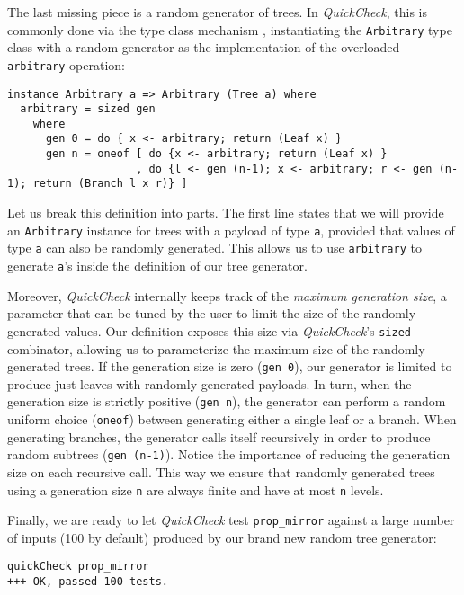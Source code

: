 \documentclass[acmsmall, anonymous]{acmart}
\newcommand{\quickcheck}{\textit{QuickCheck}\xspace}
\begin{document}
The last missing piece is a random generator of trees.
%
In \quickcheck, this is commonly done via the type class mechanism
\cite{jones1997type}, instantiating the \texttt{Arbitrary} type class with a
random generator as the implementation of the overloaded \texttt{arbitrary}
operation:

\begin{verbatim}
instance Arbitrary a => Arbitrary (Tree a) where
  arbitrary = sized gen
    where
      gen 0 = do { x <- arbitrary; return (Leaf x) }
      gen n = oneof [ do {x <- arbitrary; return (Leaf x) }
                    , do {l <- gen (n-1); x <- arbitrary; r <- gen (n-1); return (Branch l x r)} ]
\end{verbatim}

\noindent Let us break this definition into parts.
%
The first line states that we will provide an \texttt{Arbitrary} instance for
trees with a payload of type \texttt{a}, provided that values of type \texttt{a}
can also be randomly generated.
%
This allows us to use \texttt{arbitrary} to generate \texttt{a}'s inside the
definition of our tree generator.


Moreover, \quickcheck internally keeps track of the \emph{maximum generation
  size}, a parameter that can be tuned by the user to limit the size of the
randomly generated values.
%
Our definition exposes this size via \quickcheck's \texttt{sized} combinator,
allowing us to parameterize the maximum size of the randomly generated trees.
%
If the generation size is zero (\texttt{gen 0}), our generator is limited to
produce just leaves with randomly generated payloads.
%
In turn, when the generation size is strictly positive (\texttt{gen n}), the
generator can perform a random uniform choice (\texttt{oneof}) between
generating either a single leaf or a branch.
%
When generating branches, the generator calls itself recursively in order to
produce random subtrees (\texttt{gen (n-1)}).
%
Notice the importance of reducing the generation size on each recursive call.
%
This way we ensure that randomly generated trees using a generation size
\texttt{n} are always finite and have at most \texttt{n} levels.

Finally, we are ready to let \quickcheck test \texttt{prop\_mirror} against a
large number of inputs (100 by default) produced by our brand new random tree
generator:

\begin{verbatim}
quickCheck prop_mirror
+++ OK, passed 100 tests.
\end{verbatim}
\end{document}
